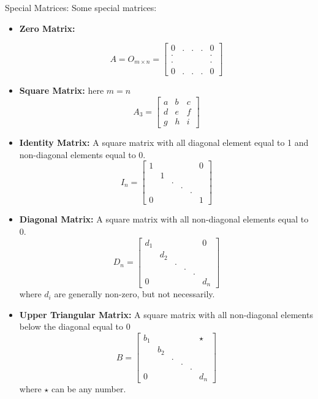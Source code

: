\documentclass{article}
\begin{document}
\begin{paragraph}{Special Matrices:} Some special matrices:
\begin{itemize}

    \item \textbf{Zero Matrix:} 
    
    \[ A = O_{m \times n} = \begin{bmatrix}
        0 & . & . & . & 0 \\
        \cdot &&&& \cdot \\
        \cdot &&&& \cdot \\
        0 & . & . & . & 0
    \end{bmatrix}\]
    
    \item \textbf{Square Matrix:} here $m = n$
        \[A_3 = \begin{bmatrix}
            a & b & c \\
            d & e & f \\
            g & h & i
        \end{bmatrix}\]

    \item \textbf{Identity Matrix:} A square matrix with all diagonal element equal to 1 and non-diagonal elements equal to 0.
        \[ I_n = \begin{bmatrix}
            1 &&&&& 0 \\
            &1&&&&\\
            &&.&&&\\
            &&&.&&\\
            &&&&.&\\
            0&&&&&1
        \end{bmatrix}\]

    \item \textbf{Diagonal Matrix:} A square matrix with all non-diagonal elements equal to 0.
        \[ D_n = \begin{bmatrix}
            d_1 &&&&& 0 \\
            &d_2&&&&\\
            &&.&&&\\
            &&&.&&\\
            &&&&.&\\
            0&&&&&d_n
        \end{bmatrix}\]
        where $d_i$ are generally non-zero, but not necessarily.
        
    \item \textbf{Upper Triangular Matrix:} A square matrix with all non-diagonal elements below the diagonal equal to 0
        \[ B = \begin{bmatrix}
            b_1 &&&&& \star \\
            &b_2&&&&\\
            &&.&&&\\
            &&&.&&\\
            &&&&.&\\
            0&&&&&d_n
        \end{bmatrix}\]
        where $\star$ can be any number.


\end{itemize}
\end{paragraph}
\end{document}
